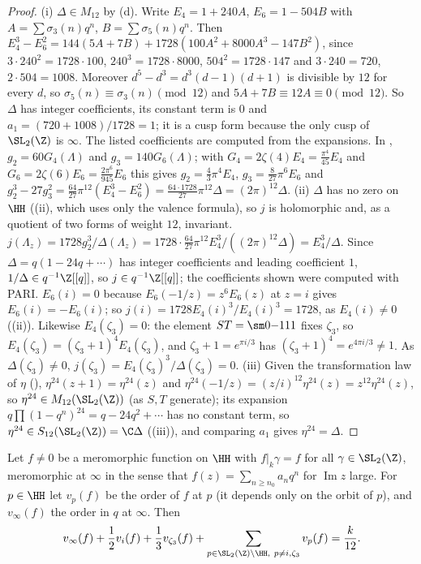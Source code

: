 \begin{proof}
(i) $\Delta\in M_{12}$ by (d). Write $E_4=1+240A$, $E_6=1-504B$ with $A=\sum\sigma_3(n)q^n$, $B=\sum\sigma_5(n)q^n$. Then
$E_4^3-E_6^2=144(5A+7B)+1728(100A^2+8000A^3-147B^2)$, since $3\cdot240^2=1728\cdot100$, $240^3=1728\cdot8000$, $504^2=1728\cdot147$ and $3\cdot240=720$, $2\cdot504=1008$.
Moreover $d^5-d^3=d^3(d-1)(d+1)$ is divisible by $12$ for every $d$, so $\sigma_5(n)\equiv\sigma_3(n)\pmod{12}$ and $5A+7B\equiv12A\equiv0\pmod{12}$. So $\Delta$ has integer
coefficients, its constant term is $0$ and $a_1=(720+1008)/1728=1$; it is a cusp form because the only cusp of $\SL_2(\Z)$ is $\infty$. The listed coefficients are computed
from the expansions. In , $g_2=60G_4(\Lambda)$ and $g_3=140G_6(\Lambda)$; with $G_4=2\zeta(4)E_4=\frac{\pi^4}{45}E_4$ and $G_6=2\zeta(6)E_6=\frac{2\pi^6}{945}E_6$ this gives
$g_2=\frac43\pi^4E_4$, $g_3=\frac8{27}\pi^6E_6$ and $g_2^3-27g_3^2=\frac{64}{27}\pi^{12}(E_4^3-E_6^2)=\frac{64\cdot1728}{27}\pi^{12}\Delta=(2\pi)^{12}\Delta$.
(ii) $\Delta$ has no zero on $\HH$ ((ii), which uses only the valence formula), so $j$ is holomorphic and, as a quotient of two forms of
weight $12$, invariant. $j(\Lambda_z)=1728g_2^3/\Delta(\Lambda_z)=1728\cdot\frac{64}{27}\pi^{12}E_4^3/((2\pi)^{12}\Delta)=E_4^3/\Delta$. Since $\Delta=q(1-24q+\cdots)$ has integer coefficients and leading
coefficient $1$, $1/\Delta\in q^{-1}\Z[[q]]$, so $j\in q^{-1}\Z[[q]]$; the coefficients shown were computed with PARI. $E_6(i)=0$ because $E_6(-1/z)=z^6E_6(z)$ at $z=i$ gives $E_6(i)=-E_6(i)$;
so $j(i)=1728E_4(i)^3/E_4(i)^3=1728$, as $E_4(i)\ne0$ ((ii)). Likewise $E_4(\zeta_3)=0$: the element $ST=\sm0{-1}11$ fixes $\zeta_3$, so
$E_4(\zeta_3)=(\zeta_3+1)^4E_4(\zeta_3)$, and $\zeta_3+1=e^{\pi i/3}$ has $(\zeta_3+1)^4=e^{4\pi i/3}\ne1$. As $\Delta(\zeta_3)\ne0$, $j(\zeta_3)=E_4(\zeta_3)^3/\Delta(\zeta_3)=0$.
(iii) Given the transformation law of $\eta$ (), $\eta^{24}(z+1)=\eta^{24}(z)$ and $\eta^{24}(-1/z)=(z/i)^{12}\eta^{24}(z)=z^{12}\eta^{24}(z)$, so $\eta^{24}\in M_{12}(\SL_2(\Z))$ (as $S,T$
generate); its expansion $q\prod(1-q^n)^{24}=q-24q^2+\cdots$ has no constant term, so $\eta^{24}\in S_{12}(\SL_2(\Z))=\C\Delta$ ((iii)), and comparing $a_1$ gives
$\eta^{24}=\Delta$.
\end{proof}

\begin{theorem}\label{thm:modforms:valence-level-one}
Let $f\ne0$ be a meromorphic function on $\HH$ with $f|_k\gamma=f$ for all $\gamma\in\SL_2(\Z)$, meromorphic at $\infty$ in the sense that $f(z)=\sum_{n\ge n_0}a_nq^n$ for $\operatorname{Im}z$
large. For $p\in\HH$ let $v_p(f)$ be the order of $f$ at $p$ (it depends only on the orbit of $p$), and $v_\infty(f)$ the order in $q$ at $\infty$. Then
\[
v_\infty(f)+\frac12v_i(f)+\frac13v_{\zeta_3}(f)+\sum_{p\in\SL_2(\Z)\backslash\HH,\ p\ne i,\zeta_3}v_p(f)=\frac k{12}.
\]
\end{theorem}

